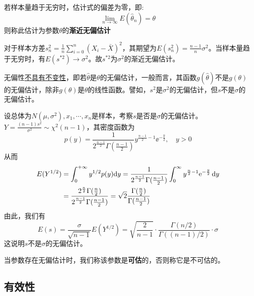 \begin{definition}[渐进无偏估计]
    若样本量趋于无穷时，估计式的偏差为零，即:
    \[ \lim_{n \to \infty}E(\hat\theta_n)=\theta \]
    则称此估计为参数$\theta$的\textbf{渐近无偏估计}
\end{definition}

\begin{example}[样本方差的渐进无偏性]
    对于样本方差$s_n^2 = \frac1n  \sum_{i=0}^n (X_i-\bar{X})^2$，其期望为$E(s_n^2) = \frac{n-1}n \sigma^2$。当样本量趋于无穷时，有$E(s^{*2})\to\sigma^2$。故$s^{*2}$为$\sigma^2$的渐近无偏估计。
\end{example}

无偏性\underline{不具有不变性}，即若$\hat{\theta}$是$\theta$的无偏估计，一般而言，其函数$g(\hat{\theta})$不是$g(\theta)$的无偏估计，除非$g(\theta)$是$\theta$的线性函数。譬如，$s^2$是$\sigma^2$的无偏估计，但$s$不是$\sigma$的无偏估计。

\begin{example}
    设总体为$N(\mu,\sigma^2), x_1, \cdots, x_n$是样本，考察$s$是否是$\sigma$的无偏估计。$Y=\frac{(n-1)s^2}{\sigma^2} \sim \chi^2(n-1)$，其密度函数为
    \[ p(y)=\frac1{2^{\frac{n-1}2} \Gamma(\frac{n-1}2)} y^{\frac{n-1}2-1}\ee^{-\frac{y}2}, \quad y>0 \]
    从而
    \begin{align*}
        E(Y^{1/2}) & =\int_0^{+\infty} y^{1/2} p(y)\mathrm{d} y = \frac1{2^{\frac{n-1}{2}} \Gamma(\frac{n-1}2)} \int_0^{\infty} y^{\frac{n}{2}-1} \mathrm e^{-\frac{y}{2}} \mathop{}\!\mathrm d y   \\
                   & =\frac{2^{\frac{n}{2}} \Gamma(\frac{n}{2})}{2^{\frac{n-1}{2}} \Gamma(\frac{n-1}{2})}=\sqrt{2} \frac{\Gamma(\frac{n}{2})}{\Gamma(\frac{n-1}{2})}
    \end{align*}
    由此，我们有
    \[E(s)=\frac{\sigma}{\sqrt{n-1}} E(Y^{1/2})=\sqrt{\frac2{n-1}} \cdot \frac{\Gamma(n/2)}{\Gamma((n-1)/2)} \cdot \sigma \]
    这说明$s$不是$\sigma$的无偏估计。
\end{example}

当参数存在无偏估计时，我们称该参数是\textbf{可估}的，否则称它是不可估的。

\subsection{有效性}


